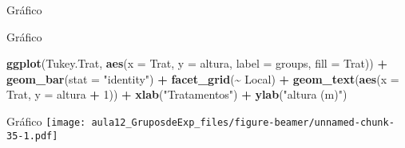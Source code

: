 \documentclass[
  ignorenonframetext,
]{beamer}
\newenvironment{Shaded}{\begin{snugshade}}{\end{snugshade}}
\newcommand{\AttributeTok}[1]{\textcolor[rgb]{0.13,0.29,0.53}{#1}}
\newcommand{\DecValTok}[1]{\textcolor[rgb]{0.00,0.00,0.81}{#1}}
\newcommand{\FunctionTok}[1]{\textcolor[rgb]{0.13,0.29,0.53}{\textbf{#1}}}
\newcommand{\NormalTok}[1]{#1}
\newcommand{\OtherTok}[1]{\textcolor[rgb]{0.56,0.35,0.01}{#1}}
\newcommand{\SpecialCharTok}[1]{\textcolor[rgb]{0.81,0.36,0.00}{\textbf{#1}}}
\newcommand{\StringTok}[1]{\textcolor[rgb]{0.31,0.60,0.02}{#1}}
\begin{document}
\begin{frame}[fragile]{Gráfico}
\protect\hypertarget{gruxe1fico}{}
\begin{Shaded}
\end{Shaded}
\end{frame}

\begin{frame}[fragile]{Gráfico}
\protect\hypertarget{gruxe1fico-1}{}
\begin{Shaded}
\begin{Highlighting}[]
\FunctionTok{ggplot}\NormalTok{(Tukey.Trat,}
       \FunctionTok{aes}\NormalTok{(}\AttributeTok{x =}\NormalTok{ Trat,}
           \AttributeTok{y =}\NormalTok{ altura,}
           \AttributeTok{label =}\NormalTok{ groups,}
           \AttributeTok{fill =}\NormalTok{ Trat)) }\SpecialCharTok{+}
  \FunctionTok{geom\_bar}\NormalTok{(}\AttributeTok{stat =} \StringTok{"identity"}\NormalTok{) }\SpecialCharTok{+}
  \FunctionTok{facet\_grid}\NormalTok{(}\SpecialCharTok{\textasciitilde{}}\NormalTok{ Local) }\SpecialCharTok{+}
  \FunctionTok{geom\_text}\NormalTok{(}\FunctionTok{aes}\NormalTok{(}\AttributeTok{x =}\NormalTok{ Trat,}
                \AttributeTok{y =}\NormalTok{ altura }\SpecialCharTok{+} \DecValTok{1}\NormalTok{)) }\SpecialCharTok{+}
  \FunctionTok{xlab}\NormalTok{(}\StringTok{"Tratamentos"}\NormalTok{) }\SpecialCharTok{+}
  \FunctionTok{ylab}\NormalTok{(}\StringTok{"altura (m)"}\NormalTok{)}
\end{Highlighting}
\end{Shaded}
\end{frame}

\begin{frame}{Gráfico}
\protect\hypertarget{gruxe1fico-2}{}
\texttt{[image: aula12\_GruposdeExp\_files/figure-beamer/unnamed-chunk-35-1.pdf]}
\end{frame}
\end{document}
